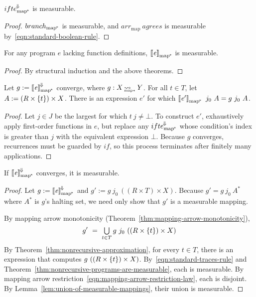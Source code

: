 \documentclass[preprint]{sigplanconf}
\newcommand{\arrow}{\rightsquigarrow}
\newcommand{\conv}{^{\mspace{-2mu}\Downarrow\mspace{-2mu}}}
\newcommand{\meaningofconv}[1]{\left\llbracket{#1}\right\rrbracket\conv}
\newcommand{\arrowarr}{\ensuremath{arr}}
\newcommand{\arrowconvif}{\ensuremath{ifte\conv}}
\newcommand{\map}{_\mathrm{map}}
\newcommand{\arrmap}{\arrowarr\map}
\newcommand{\pmap}{_\mathrm{map^{\mspace{-2mu}*}}}
\DeclareMathOperator{\pmapto}{\arrow_{\mspace{-22mu}_{\mathrm{map*}}}}
\newcommand{\convifpmap}{\arrowconvif\pmap}
\begin{document}
\begin{theorem}
$\convifpmap$ is measurable.
\end{theorem}
\begin{proof}
$branch\pmap$ is measurable, and $\arrmap~agrees$ is measurable by~\eqref{eqn:standard-boolean-rule}.
\end{proof}

\begin{theorem}
For any program $\mathit{e}$ lacking function definitions, $\meaningof{\mathit{e}}\pmap$ is measurable.
\label{thm:nonrecursive-programs-are-measurable}
\end{theorem}
\begin{proof}
By structural induction and the above theorems.
\end{proof}

\begin{theorem}
Let $g := \meaningofconv{\mathit{e}}\pmap$ converge, where $g : X \pmapto Y$.
For all $t \in T$, let $A := (R \times \{{t}\}) \times X$.
There is an expression $\mathit{e'}$ for which $\meaningof{\mathit{e'}}\pmap~j_0~A = g~j_0~A$.
\label{thm:nonrecursive-approximation}
\end{theorem}
\begin{proof}
Let $j \in J$ be the largest for which $t~j \neq \bot$.
To construct $\mathit{e'}$, exhaustively apply first-order functions in $\mathit{e}$, but replace any $\convifpmap$ whose condition's index is greater than $j$ with the equivalent expression $\bot$.
Because $g$ converges, recurrences must be guarded by $if$, so this process terminates after finitely many applications.
\end{proof}

\begin{theorem}
If $\meaningofconv{\mathit{e}}\pmap$ converges, it is measurable.
\label{thm:everything-is-measurable}
\end{theorem}
\begin{proof}
Let $g := \meaningofconv{\mathit{e}}\pmap$ and $g' := g~j_0~((R \times T) \times X)$.
Because $g' = g~j_0~A^*$ where $A^*$ is $g$'s halting set, we need only show that $g'$ is a measurable mapping.

By mapping arrow monotonicity (Theorem~\ref{thm:mapping-arrow-monotonicity}),
\begin{equation}
	g' \ =\ \textstyle\bigcup\limits_{t \in T} g~j_0~((R \times \{{t}\}) \times X)
\end{equation}
By Theorem~\ref{thm:nonrecursive-approximation}, for every $t \in T$, there is an expression that computes $g~((R \times \{{t}\}) \times X)$.
By~\eqref{eqn:standard-traces-rule} and Theorem~\ref{thm:nonrecursive-programs-are-measurable}, each is measurable.
By mapping arrow restriction~\eqref{eqn:mapping-arrow-restriction-law}, each is disjoint.
By Lemma~\ref{lem:union-of-measurable-mappings}, their union is measurable.
\end{proof}
\end{document}
